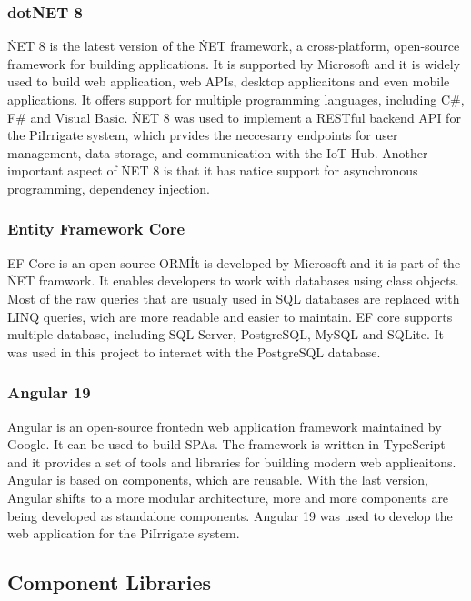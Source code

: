 \subsubsection{dotNET 8}
\.NET 8 is the latest version of the \.NET framework, a cross-platform, open-source framework for building applications. It is supported by Microsoft
and it is widely used to build web application, web APIs, desktop applicaitons and even mobile applications. It offers support for multiple programming
languages, including C\#, F\# and Visual Basic. \.NET 8 was used to implement a RESTful backend API for the PiIrrigate system, 
which prvides the neccesarry endpoints for user management, data storage, and communication with the IoT Hub. Another important aspect of \.NET 8
is that it has natice support for asynchronous programming, dependency injection\cite{dotnet8_docs}\cite{microsoft_dotnet}.

\subsubsection{Entity Framework Core}
EF Core is an open-source ORM\. It is developed by Microsoft and it is part of the \.NET framwork. It enables developers
to work with databases using class objects. Most of the raw queries that are usualy used in SQL databases are replaced with LINQ queries, 
wich are more readable and easier to maintain. EF core supports multiple database, including SQL Server, PostgreSQL, MySQL and SQLite.
It was used in this project to interact with the PostgreSQL database\cite{efcore}\cite{efcore_docs}.


\subsubsection{Angular 19}
Angular is an open-source frontedn web application framework maintained by Google. It can be used to build SPAs. The framework is written in 
TypeScript and it provides a set of tools and libraries for building modern web applicaitons. Angular is based on components, which are reusable. 
With the last version, Angular shifts to a more modular architecture, more and more components are being developed as standalone components.
Angular 19 was used to develop the web application for the PiIrrigate system\cite{angular_19_release}\cite{angular_docs}.

\subsection{Component Libraries}
